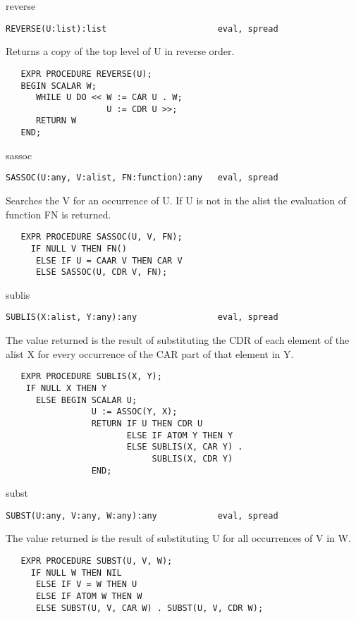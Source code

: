\begin{Function}{reverse}
\begin{verbatim}
REVERSE(U:list):list                      eval, spread
\end{verbatim}
   Returns a copy of the top level of U in reverse order.
\begin{verbatim}
   EXPR PROCEDURE REVERSE(U);
   BEGIN SCALAR W;
      WHILE U DO << W := CAR U . W;
                    U := CDR U >>;
      RETURN W
   END;
\end{verbatim}

\end{Function}
\begin{Function}{sassoc}
\begin{verbatim}
SASSOC(U:any, V:alist, FN:function):any   eval, spread
\end{verbatim}
   Searches  the  V for  an occurrence of U. If  U is not in
   the alist the evaluation of function FN is returned.
\begin{verbatim}
   EXPR PROCEDURE SASSOC(U, V, FN);
     IF NULL V THEN FN()
      ELSE IF U = CAAR V THEN CAR V
      ELSE SASSOC(U, CDR V, FN);
\end{verbatim}
\end{Function}
\begin{Function}{sublis}
\begin{verbatim}
SUBLIS(X:alist, Y:any):any                eval, spread
\end{verbatim}
  The  value returned is  the result of  substituting the CDR of
   each  element of the  alist X for every  occurrence of the CAR
   part of that element in Y.
\begin{verbatim}
   EXPR PROCEDURE SUBLIS(X, Y);
    IF NULL X THEN Y
      ELSE BEGIN SCALAR U;
                 U := ASSOC(Y, X);
                 RETURN IF U THEN CDR U
                        ELSE IF ATOM Y THEN Y
                        ELSE SUBLIS(X, CAR Y) .
                             SUBLIS(X, CDR Y)
                 END;
\end{verbatim}
\end{Function}
\begin{Function}{subst}
\begin{verbatim}
SUBST(U:any, V:any, W:any):any            eval, spread
\end{verbatim}
   The  value returned  is the result  of substituting  U for all
   occurrences of V in W.
\begin{verbatim}
   EXPR PROCEDURE SUBST(U, V, W);
     IF NULL W THEN NIL
      ELSE IF V = W THEN U
      ELSE IF ATOM W THEN W
      ELSE SUBST(U, V, CAR W) . SUBST(U, V, CDR W);
\end{verbatim}
\end{Function}

